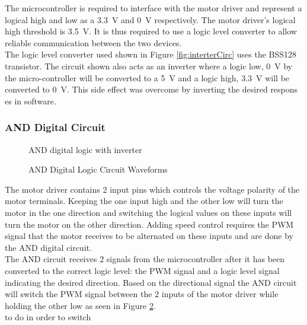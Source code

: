  
 The microcontroller is required to interface with the motor driver and represent a logical high and low as a \SI{3.3}{V} and \SI{0}{V} respectively. The motor driver's logical high threshold is \SI{3.5}{V}. It is thus required to use a logic level converter to allow reliable communication between the two devices.\\
 
 The logic level converter used shown in Figure \ref{fig:interterCirc} uses the BSS128 transistor. The circuit shown also acts as an inverter where a logic low, \SI{0}{V} by the micro-controller will be converted to a \SI{5}{V} and a logic high, \SI{3.3}{V} will be converted to \SI{0}{V}. This side effect was overcome by inverting the desired respons	es in software.
 
 
 \subsubsection{AND Digital Circuit}
 \begin{figure}[h]
 	\centering
 	
 	\caption{AND digital logic with inverter}
 	\label{fig:andCircuit}
 \end{figure}
 
 \begin{figure}[h]
 	\centering
 	
 	\caption{AND Digital Logic Circuit Waveforms}
 	\label{fig:andCircuit_waveform}
 \end{figure}
 
 The motor driver contains 2 input pins which controls the voltage polarity of the motor terminals. Keeping the one input high and the other low will turn the motor in the one direction and switching the logical values on these inputs will turn the motor on the other direction. Adding speed control requires the PWM signal that the motor receives to be alternated on these inputs and are done by the AND digital circuit.\\
 
 The AND circuit receives 2 signals from the microcontroller  after it has been converted to the correct logic level: the PWM signal and a logic level signal indicating the desired direction. Based on the directional signal the AND circuit will switch the PWM signal between the 2 inputs of the motor driver while holding the other low as seen in Figure \ref{fig:andCircuit_waveform}.\\
 
 to do in order to switch 
 
